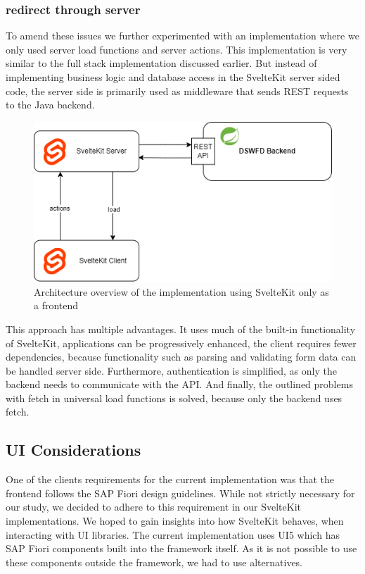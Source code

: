 \subsubsection{redirect through server}

To amend these issues we further experimented with an implementation where we only used server load functions and server actions. This implementation is very similar to the full stack implementation discussed earlier. But instead of implementing business logic and database access in the SvelteKit server sided code, the server side is primarily used as middleware that sends REST requests to the Java backend.

\begin{figure}[ht]
    \centering
    \includegraphics[width=.6\linewidth]{assets/fe-only-all-server}
    \caption{Architecture overview of the implementation using SvelteKit only as a frontend}
    \label{fig:dswfd-architecture-fe-through-server}
\end{figure}

This approach has multiple advantages. It uses much of the built-in functionality of SvelteKit, applications can be progressively enhanced, the client requires fewer dependencies, because functionality such as parsing and validating form data can be handled server side. Furthermore, authentication is simplified, as only the backend needs to communicate with the API. And finally, the outlined problems with fetch in universal load functions is solved, because only the backend uses fetch.


\subsection{UI Considerations}
\label{sec:implementation-ui}

One of the clients requirements for the current implementation was that the frontend follows the SAP Fiori design guidelines. While not strictly necessary for our study, we decided to adhere to this requirement in our SvelteKit implementations. We hoped to gain insights into how SvelteKit behaves, when interacting with UI libraries. The current implementation uses UI5 which has SAP Fiori components built into the framework itself. As it is not possible to use these components outside the framework, we had to use alternatives.   

